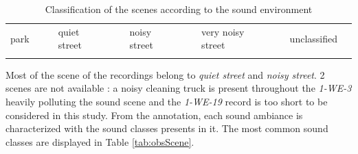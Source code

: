 \documentclass[a4,11pt,twocolumn]{article}
\begin{document}
\begin{table}[h]
\vspace{0.5cm}


\begin{tabular}{|p{1cm}|l|p{0.001cm}|p{2cm}|l|p{0.001cm}|p{2cm}|l|p{0.001cm}|p{2.75cm}|l|p{0.001cm}|p{2cm}|l|}

\hhline{|-|-|~|-|-|~|-|-|~|-|-|~|-|-|}
park & {\cellcolor[HTML]{5AB25A}} & & quiet street & {\cellcolor[HTML]{FFCB2F}} & & noisy street & {\cellcolor[HTML]{F56B00}} & &  very noisy street & {\cellcolor[HTML]{9A0000}} & & unclassified & \\
\hhline{|-|-|~|-|-|~|-|-|~|-|-|~|-|-|}

\end{tabular}


\caption{Classification of the scenes according to the sound environment}
\label{tab:classificationScene}
\end{table}

Most of the scene of the recordings belong to \textit{quiet street} and \textit{noisy street}. 2 scenes are not available : a noisy cleaning truck is present throughout the \textit{1-WE-3} heavily polluting the sound scene and the \textit{1-WE-19} record is too short to be considered in this study. From the annotation, each sound ambiance is characterized with the sound classes presents in it. The most common sound classes are displayed in Table \ref{tab:obsScene}.\\
\end{document}

